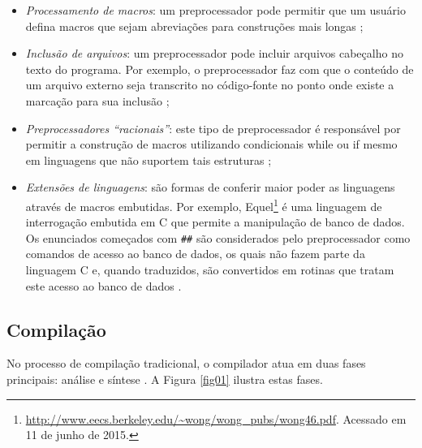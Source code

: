 \begin{itemize}

\item \textit{Processamento de macros}: um preprocessador pode permitir que um usuário 
    defina macros que sejam abreviações para construções mais longas \cite[pág. 8]{ref3};

\item \textit{Inclusão de arquivos}: um preprocessador pode incluir arquivos cabeçalho no
     texto do programa. Por exemplo, o preprocessador faz com que o conteúdo de
     um arquivo externo seja transcrito no código-fonte no ponto onde existe a 
    marcação para sua inclusão \cite[pág. 8]{ref2};

\item \textit{Preprocessadores “racionais”}: este tipo de preprocessador é responsável 
    por permitir a construção de macros utilizando condicionais while ou if mesmo
     em linguagens que não suportem tais estruturas \cite[pág. 8]{ref2};

\item \textit{Extensões de linguagens}: são formas de conferir maior poder as linguagens
     através de macros embutidas. Por exemplo, 
    Equel\footnote{\url{http://www.eecs.berkeley.edu/~wong/wong\_pubs/wong46.pdf}. Acessado em 11 de junho de 2015.} é uma linguagem de 
    interrogação embutida em C que permite a manipulação de banco de dados. 
    Os enunciados começados com \texttt{\#\#} são considerados pelo preprocessador como
     comandos de acesso ao banco de dados, os quais não fazem parte da 
    linguagem C e, quando traduzidos, são convertidos em rotinas que tratam 
    este acesso ao banco de dados \cite[pág. 8]{ref3}.

\end{itemize}

\subsection{Compilação}

No processo de compilação tradicional, o compilador atua em duas fases 
principais: análise e síntese \cite[pág. 26]{ref6}. A Figura \ref{fig01}
 ilustra estas fases. 

